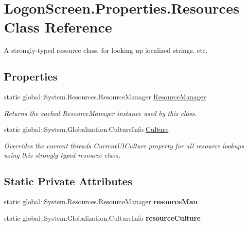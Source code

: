 \hypertarget{class_logon_screen_1_1_properties_1_1_resources}{}\section{Logon\+Screen.\+Properties.\+Resources Class Reference}
\label{class_logon_screen_1_1_properties_1_1_resources}


A strongly-\/typed resource class, for looking up localized strings, etc.  


\subsection*{Properties}
\begin{DoxyCompactItemize}
\item 
static global\+::\+System.\+Resources.\+Resource\+Manager \mbox{\hyperlink{class_logon_screen_1_1_properties_1_1_resources_ac2325a4e59a494a4509c16712905b0c2}{Resource\+Manager}}
\begin{DoxyCompactList}\small\item\em Returns the cached Resource\+Manager instance used by this class. \end{DoxyCompactList}\item 
static global\+::\+System.\+Globalization.\+Culture\+Info \mbox{\hyperlink{class_logon_screen_1_1_properties_1_1_resources_a2a86426313872aabb7d371e2f1e5f67f}{Culture}}
\begin{DoxyCompactList}\small\item\em Overrides the current thread\textquotesingle{}s Current\+U\+I\+Culture property for all resource lookups using this strongly typed resource class. \end{DoxyCompactList}\end{DoxyCompactItemize}
\subsection*{Static Private Attributes}
\begin{DoxyCompactItemize}
\item 
\mbox{\label{class_logon_screen_1_1_properties_1_1_resources_aef2ec9d17a0bc4c9542700e297f5ac97}} 
static global\+::\+System.\+Resources.\+Resource\+Manager {\bfseries resource\+Man}
\item 
\mbox{\label{class_logon_screen_1_1_properties_1_1_resources_ab6a2034d08a59418cfe4e0be4917107d}} 
static global\+::\+System.\+Globalization.\+Culture\+Info {\bfseries resource\+Culture}
\end{DoxyCompactItemize}


